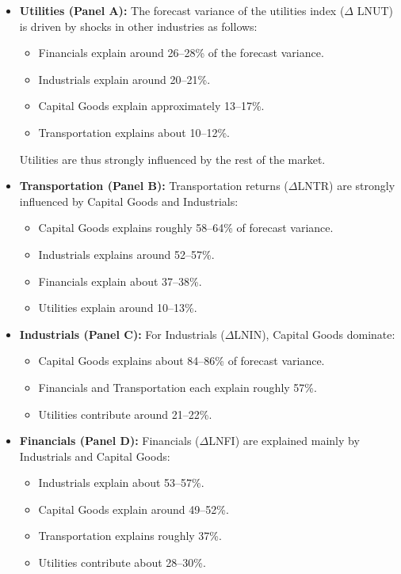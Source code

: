 \documentclass{article}
\begin{document}
\begin{itemize}
    \item \textbf{Utilities (Panel A):}  
    The forecast variance of the utilities index ($\Delta$ LNUT) is driven by shocks in other industries as follows:    
    \begin{itemize}
        \item Financials explain around 26--28\% of the forecast variance.
        \item Industrials explain around 20--21\%.
        \item Capital Goods explain approximately 13--17\%.
        \item Transportation explains about 10--12\%.
    \end{itemize}
    Utilities are thus strongly influenced by the rest of the market.

    \item \textbf{Transportation (Panel B):}  
    Transportation returns ($\Delta$LNTR) are strongly influenced by Capital Goods and Industrials:
    \begin{itemize}
        \item Capital Goods explains roughly 58--64\% of forecast variance.
        \item Industrials explains around 52--57\%.
        \item Financials explain about 37--38\%.
        \item Utilities explain around 10--13\%.
    \end{itemize}

    \item \textbf{Industrials (Panel C):}  
    For Industrials ($\Delta$LNIN), Capital Goods dominate:
    \begin{itemize}
        \item Capital Goods explains about 84--86\% of forecast variance.
        \item Financials and Transportation each explain roughly 57\%.
        \item Utilities contribute around 21--22\%.
    \end{itemize}

    \item \textbf{Financials (Panel D):}  
    Financials ($\Delta$LNFI) are explained mainly by Industrials and Capital Goods:
    \begin{itemize}
        \item Industrials explain about 53--57\%.
        \item Capital Goods explain around 49--52\%.
        \item Transportation explains roughly 37\%.
        \item Utilities contribute about 28--30\%.
    \end{itemize}


\end{itemize}
\end{document}
